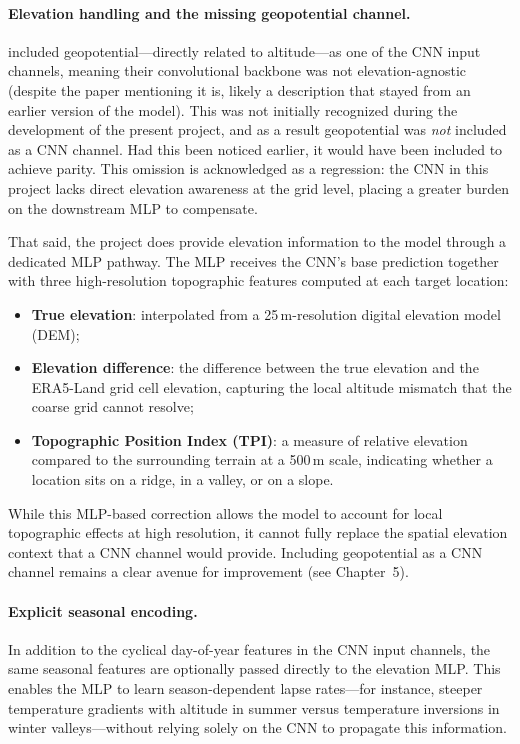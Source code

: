 \paragraph{Elevation handling and the missing geopotential channel.} \citet{vaughan2022} included geopotential---directly related to altitude---as one of the CNN input channels, meaning their convolutional backbone was not elevation-agnostic (despite the paper mentioning it is, likely a description that stayed from an earlier version of the model). This was not initially recognized during the development of the present project, and as a result geopotential was \textit{not} included as a CNN channel. Had this been noticed earlier, it would have been included to achieve parity. This omission is acknowledged as a regression: the CNN in this project lacks direct elevation awareness at the grid level, placing a greater burden on the downstream MLP to compensate.

That said, the project does provide elevation information to the model through a dedicated MLP pathway. The MLP receives the CNN's base prediction together with three high-resolution topographic features computed at each target location:
%
\begin{itemize}
    \item \textbf{True elevation}: interpolated from a 25\,m-resolution digital elevation model (DEM);
    \item \textbf{Elevation difference}: the difference between the true elevation and the ERA5-Land grid cell elevation, capturing the local altitude mismatch that the coarse grid cannot resolve;
    \item \textbf{Topographic Position Index (TPI)}: a measure of relative elevation compared to the surrounding terrain at a 500\,m scale, indicating whether a location sits on a ridge, in a valley, or on a slope.
\end{itemize}
%
While this MLP-based correction allows the model to account for local topographic effects at high resolution, it cannot fully replace the spatial elevation context that a CNN channel would provide. Including geopotential as a CNN channel remains a clear avenue for improvement (see Chapter~5).

\paragraph{Explicit seasonal encoding.} In addition to the cyclical day-of-year features in the CNN input channels, the same seasonal features are optionally passed directly to the elevation MLP. This enables the MLP to learn season-dependent lapse rates---for instance, steeper temperature gradients with altitude in summer versus temperature inversions in winter valleys---without relying solely on the CNN to propagate this information.

